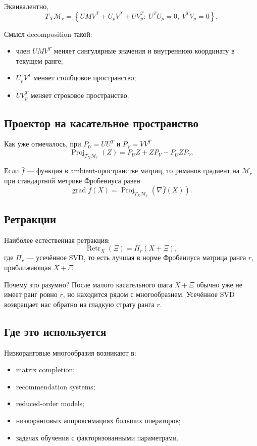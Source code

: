 \documentclass[12pt,a4paper]{article}
\theoremstyle{rudef}
\theoremstyle{ruplain}
\newcommand{\grad}{\operatorname{grad}}
\newcommand{\Proj}{\operatorname{Proj}}
\newcommand{\Retr}{\operatorname{Retr}}
\newcommand{\set}[1]{\left\{#1\right\}}
\begin{document}
Эквивалентно,
\[
T_X\mathcal M_r = \set{UMV^T + U_pV^T + UV_p^T:\ U^TU_p=0,\ V^TV_p=0}.
\]

Смысл decomposition такой:
\begin{itemize}
  \item член $UMV^T$ меняет сингулярные значения и внутреннюю координату в текущем ранге;
  \item $U_pV^T$ меняет столбцовое пространство;
  \item $UV_p^T$ меняет строковое пространство.
\end{itemize}

\subsection{Проектор на касательное пространство}

Как уже отмечалось, при $P_U=UU^T$ и $P_V=VV^T$
\[
\Proj_{T_X\mathcal M_r}(Z)=P_UZ + ZP_V - P_UZP_V.
\]

Если $\bar f$ --- функция в ambient-пространстве матриц, то риманов градиент на $\mathcal M_r$ при стандартной метрике Фробениуса равен
\[
\grad f(X)=\Proj_{T_X\mathcal M_r}(\nabla \bar f(X)).
\]

\subsection{Ретракции}

Наиболее естественная ретракция:
\[
\Retr_X(\Xi)=\Pi_r(X+\Xi),
\]
где $\Pi_r$ --- усечённое SVD, то есть лучшая в норме Фробениуса матрица ранга $r$, приближающая $X+\Xi$.

Почему это разумно? После малого касательного шага $X+\Xi$ обычно уже не имеет ранг ровно $r$, но находится рядом с многообразием. Усечённое SVD возвращает нас обратно на гладкую страту ранга $r$.

\subsection{Где это используется}

Низкоранговые многообразия возникают в:
\begin{itemize}
  \item matrix completion;
  \item recommendation systems;
  \item reduced-order models;
  \item низкоранговых аппроксимациях больших операторов;
  \item задачах обучения с факторизованными параметрами.
\end{itemize}
\end{document}

